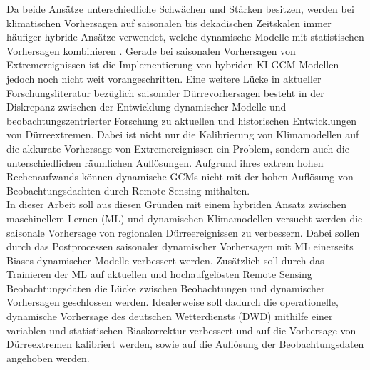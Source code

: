 \documentclass[ba-expose-lentz.tex]{subfile}
\begin{document}
Da beide Ansätze unterschiedliche Schwächen und Stärken besitzen, werden bei klimatischen Vorhersagen auf saisonalen bis dekadischen Zeitskalen immer häufiger hybride Ansätze verwendet, welche dynamische Modelle mit statistischen Vorhersagen kombinieren \parencite{li_post-processing_2021,wu_dynamic-lstm_2022}.
Gerade bei saisonalen Vorhersagen von Extremereignissen ist die Implementierung von hybriden KI-GCM-Modellen jedoch noch nicht weit vorangeschritten.
Eine weitere Lücke in aktueller Forschungsliteratur bezüglich saisonaler Dürrevorhersagen besteht in der Diskrepanz zwischen der Entwicklung dynamischer Modelle und beobachtungszentrierter Forschung zu aktuellen und historischen Entwicklungen von Dürreextremen.
Dabei ist nicht nur die Kalibrierung von Klimamodellen auf die akkurate Vorhersage von Extremereignissen ein Problem, sondern auch die unterschiedlichen räumlichen Auflösungen.
Aufgrund ihres extrem hohen Rechenaufwands können dynamische GCMs nicht mit der hohen Auflösung von Beobachtungsdachten durch Remote Sensing mithalten.\\
In dieser Arbeit soll aus diesen Gründen mit einem hybriden Ansatz zwischen maschinellem Lernen (ML) und dynamischen Klimamodellen versucht werden die saisonale Vorhersage von regionalen Dürreereignissen zu verbessern.
Dabei sollen durch das Postprocessen saisonaler dynamischer Vorhersagen mit ML einerseits Biases dynamischer Modelle verbessert werden.
Zusätzlich soll durch das Trainieren der ML auf aktuellen und hochaufgelösten Remote Sensing Beobachtungsdaten die Lücke zwischen Beobachtungen und dynamischer Vorhersagen geschlossen werden.
Idealerweise soll dadurch die operationelle, dynamische Vorhersage des deutschen Wetterdiensts (DWD) mithilfe einer variablen und statistischen Biaskorrektur verbessert und auf die Vorhersage von Dürreextremen kalibriert werden, sowie auf die Auflösung der Beobachtungsdaten angehoben werden.
\end{document}
